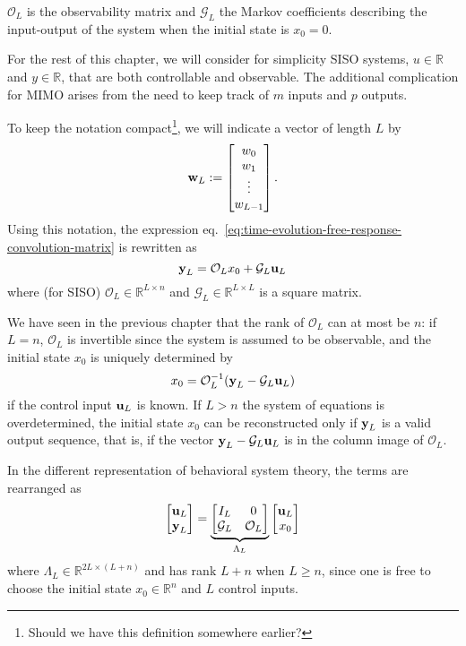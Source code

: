 $\mathcal{O}_L$ is the observability matrix and $\mathcal{G}_L$ the Markov coefficients describing the input-output of the system when the initial state is $x_0=0$.

For the rest of this chapter, we will consider for simplicity SISO systems, $u\in \mathbb{R}$ and $y\in \mathbb{R}$, that are both controllable and observable. The additional complication for MIMO arises from the need to keep track of $m$ inputs and $p$ outputs.

To keep the notation compact\footnote{Should we have this definition somewhere earlier?}, we will indicate a vector of length $L$ by
\begin{equation*}
  \boldsymbol{\mathrm{w}}_L :=
  \begin{bmatrix}
    w_0 \\ w_1 \\ \vdots \\ w_{L-1}
  \end{bmatrix}.
\end{equation*}
Using this notation, the expression eq.~\eqref{eq:time-evolution-free-response-convolution-matrix} is rewritten as
\begin{equation*}
  \boldsymbol{\mathrm{y}}_L = \mathcal{O}_Lx_0 + \mathcal{G}_L\boldsymbol{\mathrm{u}}_L
\end{equation*}
where (for SISO) $\mathcal{O}_L\in\mathbb{R}^{L\times n}$ and $\mathcal{G}_L\in \mathbb{R}^{L\times L}$ is a square matrix.

We have seen in the previous chapter that the rank of $\mathcal{O}_L$ can at most be $n$: if $L=n$, $\mathcal{O}_L$ is invertible since the system is assumed to be observable, and the initial state $x_0$ is uniquely determined by
\begin{equation*}
  x_0 = \mathcal{O}_L^{-1}(\boldsymbol{\mathrm{y}}_L - \mathcal{G}_L\boldsymbol{\mathrm{u}}_L)
\end{equation*}
if the control input $\boldsymbol{\mathrm{u}}_L$ is known. If $L>n$ the system of equations is overdetermined, the initial state $x_0$ can be reconstructed only if $\boldsymbol{\mathrm{y}}_L$ is a valid output sequence, that is, if the vector $\boldsymbol{\mathrm{y}}_L - \mathcal{G}_L\boldsymbol{\mathrm{u}}_L$ is in the column image of $\mathcal{O}_L$.

In the different representation of behavioral system theory, the terms are rearranged as
\begin{equation*}
  \begin{bmatrix}
    \boldsymbol{\mathrm{u}}_L \\ \boldsymbol{\mathrm{y}}_L
  \end{bmatrix} = \underbrace{
  \begin{bmatrix}
    I_L & 0 \\ \mathcal{G}_L & \mathcal{O}_L
  \end{bmatrix}}_{\Lambda_L}
\begin{bmatrix}
  \boldsymbol{\mathrm{u}}_L \\ x_0
\end{bmatrix}
\end{equation*}
where $\Lambda_L\in \mathbb{R}^{2L\times(L+n)}$ and has rank $L+n$ when $L\ge n$, since one is free to choose the initial state $x_0\in \mathbb{R}^n$ and $L$ control inputs.


